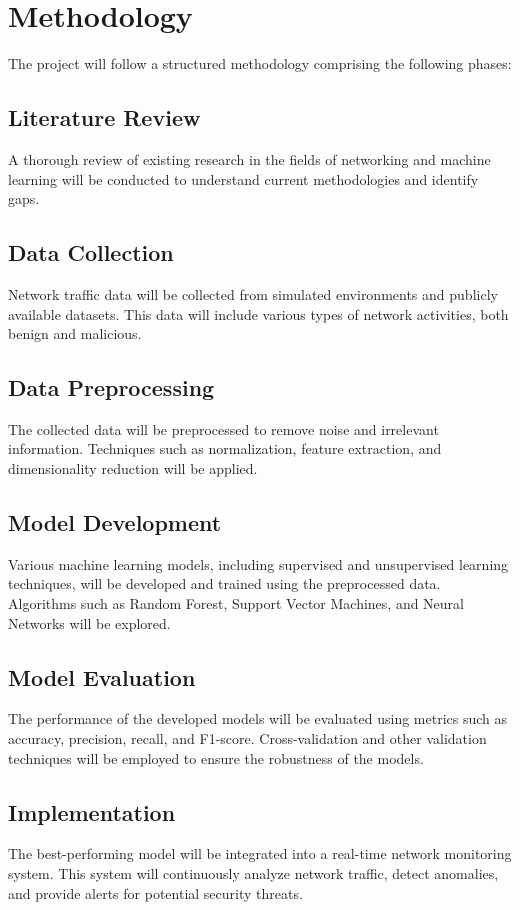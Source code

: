 \documentclass[12pt]{article}
\begin{document}
\section{Methodology}
The project will follow a structured methodology comprising the following phases:

\subsection{Literature Review}
A thorough review of existing research in the fields of networking and machine learning will be conducted to understand current methodologies and identify gaps.

\subsection{Data Collection}
Network traffic data will be collected from simulated environments and publicly available datasets. This data will include various types of network activities, both benign and malicious.

\subsection{Data Preprocessing}
The collected data will be preprocessed to remove noise and irrelevant information. Techniques such as normalization, feature extraction, and dimensionality reduction will be applied.

\subsection{Model Development}
Various machine learning models, including supervised and unsupervised learning techniques, will be developed and trained using the preprocessed data. Algorithms such as Random Forest, Support Vector Machines, and Neural Networks will be explored.

\subsection{Model Evaluation}
The performance of the developed models will be evaluated using metrics such as accuracy, precision, recall, and F1-score. Cross-validation and other validation techniques will be employed to ensure the robustness of the models.

\subsection{Implementation}
The best-performing model will be integrated into a real-time network monitoring system. This system will continuously analyze network traffic, detect anomalies, and provide alerts for potential security threats.
\end{document}
